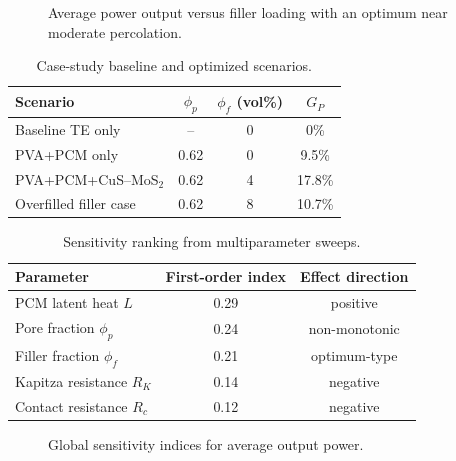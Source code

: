 \begin{figure}[htbp]
\centering
{}
\caption{Average power output versus filler loading with an optimum near moderate percolation.}
\label{fig:case_power_loading}
\end{figure}

\begin{table}[htbp]
\centering
\caption{Case-study baseline and optimized scenarios.}
\label{tab:case_scenarios}
\begin{tabular}{lccc}
\toprule
Scenario & $\phi_p$ & $\phi_f$ (vol\%) & $G_P$ \\
\midrule
Baseline TE only & -- & 0 & 0\% \\
PVA+PCM only & 0.62 & 0 & 9.5\% \\
PVA+PCM+CuS--MoS$_2$ & 0.62 & 4 & 17.8\% \\
Overfilled filler case & 0.62 & 8 & 10.7\% \\
\bottomrule
\end{tabular}
\end{table}

\begin{table}[htbp]
\centering
\caption{Sensitivity ranking from multiparameter sweeps.}
\label{tab:case_sensitivity}
\begin{tabular}{lcc}
\toprule
Parameter & First-order index & Effect direction \\
\midrule
PCM latent heat $L$ & 0.29 & positive \\
Pore fraction $\phi_p$ & 0.24 & non-monotonic \\
Filler fraction $\phi_f$ & 0.21 & optimum-type \\
Kapitza resistance $R_K$ & 0.14 & negative \\
Contact resistance $R_c$ & 0.12 & negative \\
\bottomrule
\end{tabular}
\end{table}

\begin{figure}[htbp]
\centering
{}
\caption{Global sensitivity indices for average output power.}
\label{fig:case_sensitivity}
\end{figure}
